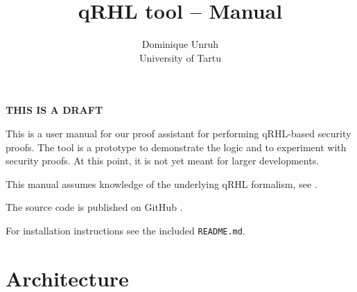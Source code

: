 \documentclass{article}
\begin{document}
\title{qRHL tool -- Manual}
\author{Dominique Unruh\\\small University of Tartu}
\date{}


\maketitle

\ifdraft
\begin{center}
  \LARGE\bfseries
  THIS IS A DRAFT
\end{center}
\fi

\let\subsubsection\subsection
\let\subsection\section

\tableofcontents

This is a user manual for our proof assistant for
performing qRHL-based security proofs.  The tool is a prototype to
demonstrate the logic and to experiment with security proofs. At this
point, it is not yet meant for larger developments.

This manual assumes knowledge of the underlying qRHL formalism, see
\cite{qrhl-paper-from-manual}.

The source code is published on GitHub \cite{github-source}.

For installation instructions see the included \texttt{README.md}.


\subsection{Architecture}
\end{document}
